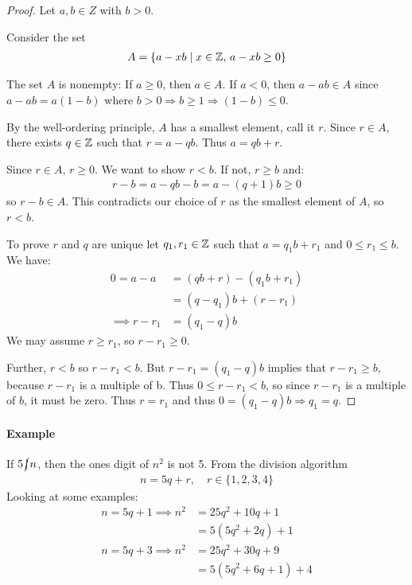 \documentclass[../main.tex]{subfiles}
\begin{document}
\begin{proof}
    Let $a, b \in Z$ with $b > 0$.

    Consider the set 
    \begin{align*}
        A = \{
            a - xb \mid x \in \mathbb{Z},\, a - xb \geq 0
        \}
    \end{align*}

    The set $A$ is nonempty: If $a \geq 0$, then $a \in A$. If $a < 0$, then $a - ab \in A$ 
    since $a - ab = a (1 - b)$ where $b > 0 \Rightarrow b \geq 1 \Rightarrow (1 - b) \leq 0$.

    By the well-ordering principle, $A$ has a smallest element, call it $r$. Since $r \in A$,
    there exists $q \in \mathbb{Z}$ such that $r = a - qb.$ Thus $a = qb + r$.

    Since $r \in A,\, r \geq 0$. We want to show $r < b$. If not, $r \geq b$ and:
    \begin{align*}
        r - b = a - qb - b = a - (q + 1)b \geq 0
    \end{align*}
    so $r - b \in A$. This contradicts our choice of $r$ as the smallest element of $A$,
    so $r < b$.

    To prove $r$ and $q$ are unique let $q_1, r_1 \in \mathbb{Z}$ such that $a = q_1 b + r_1$ and
    $0 \leq r_ 1 \leq b.$ We have:
    \begin{align*}
        0 = a - a &= (qb + r) - (q_1 b + r_1) \\
                  &= (q - q_1) b + (r - r_1) \\
        \implies  r - r_1 &=  (q_1 - q) b
    \end{align*}
    We may assume $r \geq r_1$, so $r - r_1 \geq 0$. 

    Further, $r < b$ so $r - r_1 < b$. But $r - r_1 = (q_1 - q) b$ implies that
    $r - r_1 \geq b$, because $r - r_1$ is a multiple of b. Thus $ 0 \leq r - r_1 < b$,
    so since $r - r_1$ is a multiple of $b$, it must be zero. Thus $r = r_1$ and thus
    $0 = (q_1 - q)b \Rightarrow q_1 = q$.
\end{proof}

\paragraph{Example} If $5 \,\cancel{|}\, n$, then the ones digit of $n^2$ is not 5.
From the division algorithm
\begin{align*}
    n = 5q +r, \quad r \in \{1,2,3,4\}
\end{align*}
Looking at some examples:
\begin{align*}
    n = 5q + 1 \implies n^2 &= 25q^2 + 10q + 1 \\
                            &= 5(5q^2 + 2q) + 1 \\
    n = 5q + 3 \implies n^2 &= 25q^2 + 30q + 9 \\
                            &= 5(5q^2 + 6q + 1) + 4
\end{align*}
\end{document}
